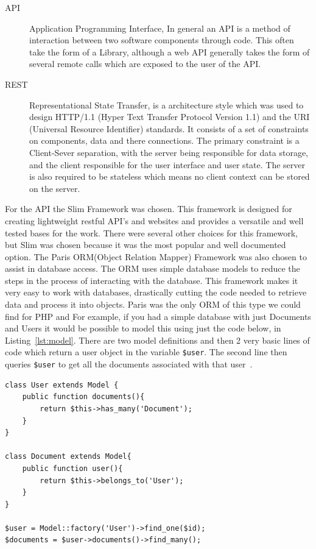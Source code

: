 \documentclass[11pt,a4paper]{article}
\begin{document}
\begin{description}
\item[API] Application Programming Interface, In general an API is a method of interaction between two software components through code. This often take the form of a Library, although a web API generally takes the form of several remote calls which are exposed to the user of the API. 

\item[REST] Representational State Transfer, is a architecture style which was used to design HTTP/1.1 (Hyper Text Transfer Protocol Version 1.1) and the URI (Universal Resource Identifier) standards. It consists of a set of constraints on components, data and there connections. The primary constraint is a Client-Sever separation, with the server being responsible for data storage, and the client responsible for the user interface and user state. The server is also required to be stateless which means no client context can be stored on the server.
\end{description}

For the API the Slim Framework\cite{slim} was chosen. This framework is designed for creating lightweight restful API's and websites and provides a versatile and well tested bases for the work. There were several other choices for this framework, but Slim was chosen because it was the most popular and well documented option. The Paris ORM(Object Relation Mapper) Framework\cite{paris} was also chosen to assist in database access. The ORM uses simple database models to reduce the steps in the process of interacting with the database. This framework makes it very easy to work with databases, drastically cutting the code needed to retrieve data and process it into objects. Paris was the only ORM of this type we could find for PHP and  For example, if you had a simple database with just Documents and Users it would be possible to model this using just the code below, in Listing~\ref{lst:model}. There are two model definitions and then 2 very basic lines of code which return a user object in the variable \lstinline{$user}. The second line then queries \lstinline{$user} to get all the documents associated with that user~\cite{TomMilestone2}. 


\begin{lstlisting}[captionpos=b, caption=Model Snippet, label=lst:model, frame=single]
class User extends Model {
	public function documents(){
		return $this->has_many('Document');
	}
}

class Document extends Model{
	public function user(){
		return $this->belongs_to('User');
	}
}

$user = Model::factory('User')->find_one($id); 
$documents = $user->documents()->find_many();
\end{lstlisting}
\end{document}
